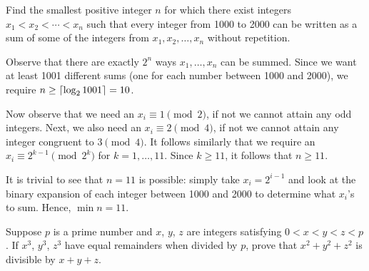 \begin{question}[11]\label{A::2024-S-2-3}
    Find the smallest positive integer $n$ for which there exist integers $x_1 < x_2 < \cdots < x_n$ such that every integer from 1000 to 2000 can be written as a sum of some of the integers from $x_1, x_2, \ldots, x_n$ without repetition.
\end{question}
\begin{solution*}
    Observe that there are exactly $2^n$ ways $x_1, \ldots, x_n$ can be summed. Since we want at least 1001 different sums (one for each number between 1000 and 2000), we require $n \geq \left\lceil \log_2 1001 \right\rceil = 10$.

    Now observe that we need an $x_i \equiv 1 \pmod{2}$, if not we cannot attain any odd integers. Next, we also need an $x_i \equiv 2 \pmod{4}$, if not we cannot attain any integer congruent to $3 \pmod{4}$. It follows similarly that we require an $x_i \equiv 2^{k-1} \pmod{2^k}$ for $k = 1, \ldots, 11$. Since $k \geq 11$, it follows that $n \geq 11$.

    It is trivial to see that $n = 11$ is possible: simply take $x_i = 2^{i-1}$ and look at the binary expansion of each integer between 1000 and 2000 to determine what $x_i$'s to sum. Hence, $\min n = 11$.
\end{solution*}

\begin{question}\label{A::2024-S-2-4}
    Suppose $p$ is a prime number and $x$, $y$, $z$ are integers satisfying $0 < x < y < z < p$. If $x^3$, $y^3$, $z^3$ have equal remainders when divided by $p$, prove that $x^2 + y^2 + z^2$ is divisible by $x + y + z$.
\end{question}

